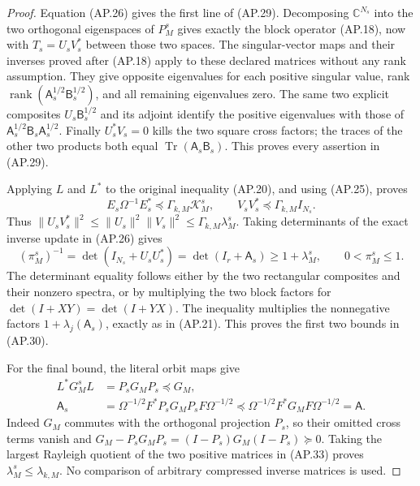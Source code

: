 \begin{proof}
Equation (AP.26) gives the first line of (AP.29).  Decomposing
\(\mathbb C^{N_s}\) into the two orthogonal eigenspaces of
\(P_M^s\) gives exactly the block operator (AP.18), now with
\(T_s=U_sV_s^*\) between those two spaces.  The singular-vector
maps and their inverses proved after (AP.18) apply to these declared
matrices without any rank assumption.  They give opposite eigenvalues
for each positive singular value, rank
\(\operatorname{rank}(\mathsf A_s^{1/2}\mathsf B_s^{1/2})\),
and all remaining eigenvalues zero.  The same two explicit composites
\(U_s\mathsf B_s^{1/2}\) and its adjoint identify the
positive eigenvalues with those of
\(\mathsf A_s^{1/2}\mathsf B_s\mathsf A_s^{1/2}\).
Finally \(U_s^*V_s=0\) kills the two square cross factors;
the traces of the other two products both equal
\(\operatorname{Tr}(\mathsf A_s\mathsf B_s)\).
This proves every assertion in (AP.29).

Applying \(L\) and \(L^*\) to the original inequality
(AP.20), and using (AP.25), proves
\[
 E_s\Omega^{-1}E_s^*
      \preceq\Gamma_{k,M}\mathcal K_M^s,\qquad
 V_sV_s^*\preceq\Gamma_{k,M}I_{N_s}.                  \tag{AP.31}
\]
Thus \(\|U_sV_s^*\|^2\le\|U_s\|^2\|V_s\|^2
\le\Gamma_{k,M}\lambda_M^s\).  Taking determinants of
the exact inverse update in (AP.26) gives
\[
 (\pi_M^s)^{-1}=\det(I_{N_s}+U_sU_s^*)
              =\det(I_r+\mathsf A_s)
              \ge1+\lambda_M^s,\qquad 0<\pi_M^s\le1.
                                                               \tag{AP.32}
\]
The determinant equality follows either by the two rectangular
composites and their nonzero spectra, or by multiplying the two
block factors for \(\det(I+XY)=\det(I+YX)\).
The inequality multiplies the nonnegative factors
\(1+\lambda_j(\mathsf A_s)\), exactly as in (AP.21).
This proves the first two bounds in (AP.30).

For the final bound, the literal orbit maps give
\[
 \begin{split}
 L^*G_M^sL&=P_sG_MP_s\preceq G_M,\\
 \mathsf A_s
 &=\Omega^{-1/2}F^*P_sG_MP_sF\Omega^{-1/2}
       \preceq\Omega^{-1/2}F^*G_MF\Omega^{-1/2}
        =\mathsf A.
 \end{split}                                                  \tag{AP.33}
\]
Indeed \(G_M\) commutes with the orthogonal projection
\(P_s\), so their omitted cross terms vanish and
\(G_M-P_sG_MP_s=(I-P_s)G_M(I-P_s)\succeq0\).
Taking the largest Rayleigh quotient of the two positive matrices
in (AP.33) proves \(\lambda_M^s\le\lambda_{k,M}\).
No comparison of arbitrary compressed inverse matrices is used.
\end{proof}

